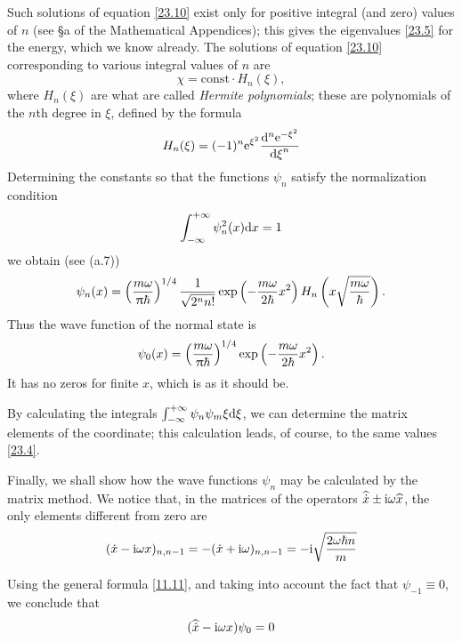 Such solutions of equation \eqref{23.10} exist only for positive integral (and zero) values of $ n $ (see \S a of the Mathematical Appendices); this gives the eigenvalues \eqref{23.5} for the energy, which we know already. The solutions of equation \eqref{23.10} corresponding to various integral values of $ n $ are 
\[ \chi=\mathrm{const}\cdot H_n(\xi) ,\] 
where $ H_n(\xi) $ are what are called \textit{Hermite polynomials}; these are polynomials of the $ n $th degree in $\xi$, defined by the formula
\begin{equation}\label{23.11}
H_n(\xi)=(-1)^n\mathrm{e}^{\xi^2}\frac{\mathrm{d}^n \mathrm{e}^{-\xi^2}}{{\mathrm{d} \xi}^n}
\end{equation}
Determining the constants so that the functions $\psi_n$ satisfy the normalization condition
\[ \int_{-\infty}^{+\infty}\psi^2_n(x)\mathrm{d} x=1 \]
we obtain (see (a.7))
\begin{equation}\label{23.12}
\psi_n(x)=\left(\frac{m\omega}{\uppi\hbar} \right)^{1/4}\frac{1}{\sqrt{2^n n!}}\exp\left(-\frac{m\omega}{2\hbar}x^2\right)H_n\left( x\sqrt{\frac{m\omega}{\hbar}}\right).
\end{equation}
Thus the wave function of the normal state is
\begin{equation}\label{23.13}
\psi_0(x)=\left(\frac{m\omega}{\uppi\hbar} \right)^{1/4}\exp\left(-\frac{m\omega}{2\hbar}x^2\right).
\end{equation}
It has no zeros for finite $ x $, which is as it should be.

By calculating the integrals $ \int_{-\infty}^{+\infty}\psi_n\psi_m\xi\mathrm{d} \xi $, we can determine the matrix elements of the coordinate; this calculation leads, of course, to the same values \eqref{23.4}.

Finally, we shall show how the wave functions $\psi_n$ may be calculated by the matrix method. We notice that, in the matrices of the operators $ \widehat{\dot{x}}\pm\mathrm{i}\omega\widehat{x} $, the only elements different from zero are
\begin{equation}\label{23.14}
(\dot{x}-\mathrm{i}\omega x)_{n,n-1}=-(\dot{x}+\mathrm{i}\omega)_{n,n-1}=-\mathrm{i}\sqrt{\frac{2\omega\hbar n}{m}}
\end{equation}



Using the general formula \eqref{11.11}, and taking into account the fact that $ \psi_{−1}\equiv 0 $, we conclude that
\[ (\widehat{\dot{x}}-\mathrm{i}\omega x)\psi_0=0 \]


